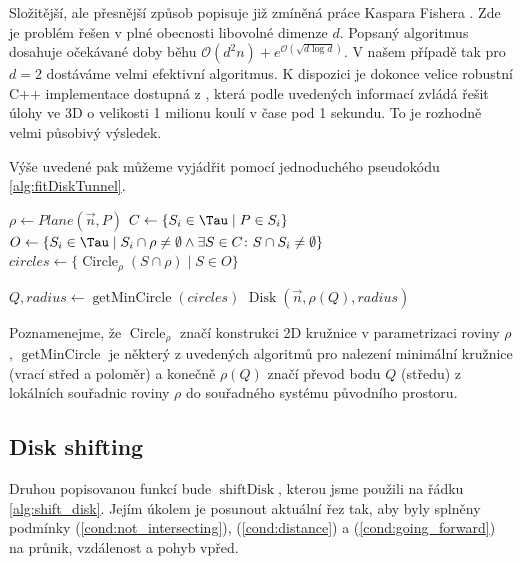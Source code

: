 Složitější, ale přesnější způsob popisuje již zmíněná práce Kaspara Fishera
\cite{FisherBalls}. Zde je problém řešen v plné obecnosti libovolné dimenze $ d $.
Popsaný algoritmus dosahuje očekávané doby běhu
$ \mathcal{O}(d^2n) + e^{\mathcal{O}(\sqrt{d \log{d}})} $. V našem případě tak pro
$ d = 2 $ dostáváme velmi efektivní algoritmus. K dispozici je dokonce velice
robustní C++ implementace dostupná z \cite{cpp_balls}, která podle uvedených informací
zvládá řešit úlohy ve 3D o velikosti 1 milionu koulí v čase pod 1 sekundu. To
je rozhodně velmi působivý výsledek.

Výše uvedené pak můžeme vyjádřit pomocí jednoduchého pseudokódu \ref{alg:fitDiskTunnel}.

\begin{algorithmic}[1]
\label{alg:fitDiskTunnel}

    \State $ \rho \gets Plane(\vec{n}, P) $
    \State $ C \gets \{S_i \in \Tau \mid P \in S_i \} $
    \State $ O \gets \{ S_i \in \Tau
        \mid S_i \cap \rho \neq \emptyset
            \wedge \exists S \in C \colon S \cap S_i \neq \emptyset  \} $
    \State $ circles \gets \{ \operatorname{Circle}_{\rho}(S \cap \rho) \mid S \in O \} $
    \State

    \State $ Q, radius \gets \operatorname{getMinCircle}(circles) $
    \State \Return $ \operatorname{Disk}(\vec{n}, \rho(Q), radius) $
\EndFunction

\end{algorithmic}

Poznamenejme, že $ \operatorname{Circle}_{\rho} $ značí konstrukci 2D kružnice
v parametrizaci roviny $ \rho $, $ \operatorname{getMinCircle} $ je některý z
uvedených algoritmů pro nalezení minimální kružnice (vrací střed a poloměr)
a konečně $ \rho(Q) $ značí převod bodu $ Q $ (středu) z lokálních souřadnic
roviny $ \rho $ do souřadného systému původního prostoru.



\subsection{Disk shifting} \label{subsec:disk_shift}
Druhou popisovanou funkcí bude $ \operatorname{shiftDisk} $, kterou jsme použili
na řádku \ref{alg:shift_disk}. Jejím úkolem je posunout aktuální řez tak, aby
byly splněny podmínky (\ref{cond:not_intersecting}), (\ref{cond:distance})
a (\ref{cond:going_forward}) na průnik, vzdálenost a pohyb vpřed.

